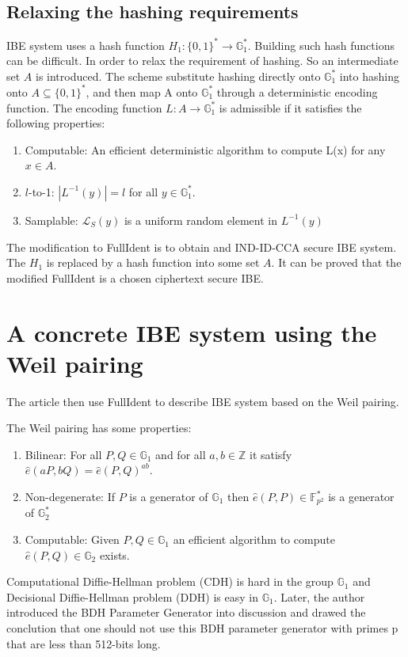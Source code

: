 \documentclass[11pt,en]{elegantpaper}
\begin{document}
\subsection{Relaxing the hashing requirements}
IBE system uses a hash function $H_1:\{0,1\}^*\rightarrow\mathbb{G}_1^*$. Building such hash functions can be difficult. In order to relax the requirement of hashing. So an intermediate set $A$ is introduced. The scheme substitute hashing directly onto $\mathbb{G}_1^*$ into hashing onto $A\subseteq\{0,1\}^*$, and then map A onto $\mathbb{G}_1^*$ through a deterministic encoding function. 
The encoding function $L:A\rightarrow\mathbb{G}_1^*$ is admissible if it satisfies the following properties:
\begin{enumerate}
	\item Computable: An efficient deterministic algorithm to compute L(x) for any $x\in A$.
	\item $l$-to-1: $|L^{-1}(y)|=l$ for all $y\in \mathbb{G}_1^*$.
	\item Samplable: $\mathcal{L}_S(y)$ is a uniform random element in $L^{-1}(y)$
\end{enumerate}
The modification to FullIdent is to obtain and IND-ID-CCA secure IBE system. The $H_1$ is replaced by a hash function into some set $A$. It can be proved that the modified FullIdent is a chosen ciphertext secure IBE.
 
\section{A concrete IBE system using the Weil pairing}
The article then use FullIdent to describe IBE system based on the Weil pairing. 

The Weil pairing has some properties:
\begin{enumerate}
	\item Bilinear: For all $P,Q\in \mathbb{G}_1$ and for all $a,b\in \mathbb{Z}$ it satisfy $\hat{e}(a P, b Q)=\hat{e}(P, Q)^{a b}$.
	\item Non-degenerate: If $P$ is a generator of $\mathbb{G}_1$ then $\hat{e}(P, P) \in \mathbb{F}_{p^{2}}^{*}$ is a generator of $\mathbb{G}_2^*$
	\item Computable: Given $P, Q \in \mathbb{G}_{1}$ an efficient algorithm to compute $\hat{e}(P, Q) \in \mathbb{G}_{2}$ exists.
\end{enumerate}
Computational Diffie-Hellman problem (CDH) is hard in the group $\mathbb{G}_1$ and Decisional Diffie-Hellman problem (DDH) is easy in $\mathbb{G}_1$. Later, the author introduced the BDH Parameter Generator into discussion and drawed the conclution that one should not use this BDH parameter generator with primes p that are less than 512-bits long.
\end{document}
